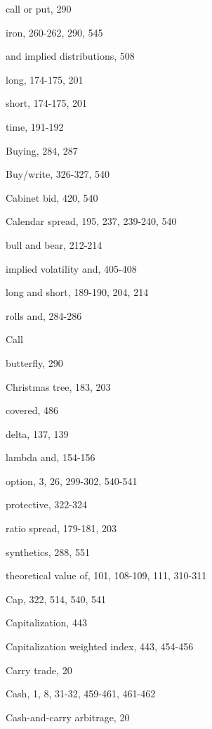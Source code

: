 \noindent call or put, 290\par
\noindent iron, 260-262, 290, 545\par
\noindent and implied distributions, 508\par
\noindent long, 174-175, 201\par
\noindent short, 174-175, 201\par
\noindent time, 191-192\par
\noindent Buying, 284, 287\par
\noindent Buy/write, 326-327, 540\par
\noindent Cabinet bid, 420, 540\par
\noindent Calendar spread, 195, 237, 239-240, 540\par
\noindent bull and bear, 212-214\par
\noindent implied volatility and, 405-408\par
\noindent long and short, 189-190, 204, 214\par
\noindent rolls and, 284-286\par
\noindent Call\par
\noindent butterfly, 290\par
\noindent Christmas tree, 183, 203\par
\noindent covered, 486\par
\noindent delta, 137, 139\par
\noindent lambda and, 154-156\par
\noindent option, 3, 26, 299-302, 540-541\par
\noindent protective, 322-324\par
\noindent ratio spread, 179-181, 203\par
\noindent synthetics, 288, 551\par
\noindent theoretical value of, 101, 108-109, 111, 310-311\par
\noindent Cap, 322, 514, 540, 541\par
\noindent Capitalization, 443\par
\noindent Capitalization weighted index, 443, 454-456\par
\noindent Carry trade, 20\par
\noindent Cash, 1, 8, 31-32, 459-461, 461-462\par
\noindent Cash-and-carry arbitrage, 20\par

